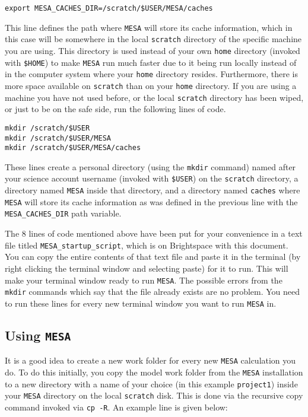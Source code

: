 \documentclass[11pt,a4paper]{article}
\begin{document}
\begin{verbatim}
export MESA_CACHES_DIR=/scratch/$USER/MESA/caches
\end{verbatim}
This line defines the path where \texttt{MESA} will store its cache information, which in this case will be somewhere in the local \texttt{scratch} directory of the specific machine you are using. This directory is used instead of your own \texttt{home} directory (invoked with \texttt{\$HOME}) to make \texttt{MESA} run much faster due to it being run locally instead of in the computer system where your \texttt{home} directory resides. Furthermore, there is more space available on \texttt{scratch} than on your \texttt{home} directory. If you are using a machine you have not used before, or the local \texttt{scratch} directory has been wiped, or just to be on the safe side, run the following lines of code. 

\begin{verbatim}
mkdir /scratch/$USER
mkdir /scratch/$USER/MESA
mkdir /scratch/$USER/MESA/caches
\end{verbatim}
These lines create a personal directory (using the \texttt{mkdir} command) named after your science account username (invoked with \texttt{\$USER}) on the \texttt{scratch} directory, a directory named \texttt{MESA} inside that directory, and a directory named \texttt{caches} where \texttt{MESA} will store its cache information as was defined in the previous line with the \texttt{MESA\_CACHES\_DIR} path variable.

\bigskip\noindent
The 8 lines of code mentioned above have been put for your convenience in a text file titled \texttt{MESA\_startup\_script}, which is on Brightspace with this document. You can copy the entire contents of that text file and paste it in the terminal (by right clicking the terminal window and selecting paste) for it to run. This will make your terminal window ready to run \texttt{MESA}. The possible errors from the \texttt{mkdir} commands which say that the file already exists are no problem. You need to run these lines for every new terminal window you want to run \texttt{MESA} in.

\subsection{Using \texttt{MESA}}

It is a good idea to create a new work folder for every new \texttt{MESA} calculation you do. To do this initially, you copy the model work folder from the \texttt{MESA} installation to a new directory with a name of your choice (in this example \texttt{project1}) inside your \texttt{MESA} directory on the local \texttt{scratch} disk. This is done via the recursive copy command invoked via \texttt{cp -R}. An example line is given below:
\end{document}
